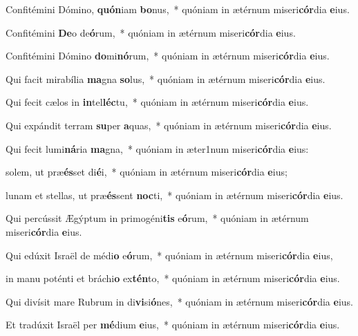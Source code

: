 \item Confitémini Dómino, \textbf{quón}iam \textbf{bo}nus,~* quóniam in ætérnum miseri\textbf{cór}dia \textbf{e}ius.

\item Confitémini \textbf{De}o de\textbf{ó}rum,~* quóniam in ætérnum miseri\textbf{cór}dia \textbf{e}ius.

\item Confitémini Dómino \textbf{do}mi\textbf{nó}rum,~* quóniam in ætérnum miseri\textbf{cór}dia \textbf{e}ius.

\item Qui facit mirabília \textbf{ma}gna \textbf{so}lus,~* quóniam in ætérnum miseri\textbf{cór}dia \textbf{e}ius.

\item Qui fecit cælos in \textbf{in}tel\textbf{léc}tu,~* quóniam in ætérnum miseri\textbf{cór}dia \textbf{e}ius.

\item Qui expándit terram \textbf{su}per \textbf{a}quas,~* quóniam in ætérnum miseri\textbf{cór}dia \textbf{e}ius.

\item Qui fecit lumi\textbf{ná}ria \textbf{ma}gna,~* quóniam in æter1num miseri\textbf{cór}dia \textbf{e}ius:

\item solem, ut præ\textbf{és}set di\textbf{é}i,~* quóniam in ætérnum miseri\textbf{cór}dia \textbf{e}ius;

\item lunam et stellas, ut præ\textbf{és}sent \textbf{noc}ti,~* quóniam in ætérnum miseri\textbf{cór}dia \textbf{e}ius.

\item Qui percússit Ægýptum in primogéni\textbf{tis} e\textbf{ó}rum,~* quóniam in ætérnum miseri\textbf{cór}dia \textbf{e}ius.

\item Qui edúxit Israël de médi\textbf{o} e\textbf{ó}rum,~* quóniam in ætérnum miseri\textbf{cór}dia \textbf{e}ius,

\item in manu poténti et bráchi\textbf{o} ex\textbf{tén}to,~* quóniam in ætérnum miseri\textbf{cór}dia \textbf{e}ius.

\item Qui divísit mare Rubrum in di\textbf{vi}si\textbf{ó}nes,~* quóniam in ætérnum miseri\textbf{cór}dia \textbf{e}ius.

\item Et tradúxit Israël per \textbf{mé}dium \textbf{e}ius,~* quóniam in ætérnum miseri\textbf{cór}dia \textbf{e}ius.

